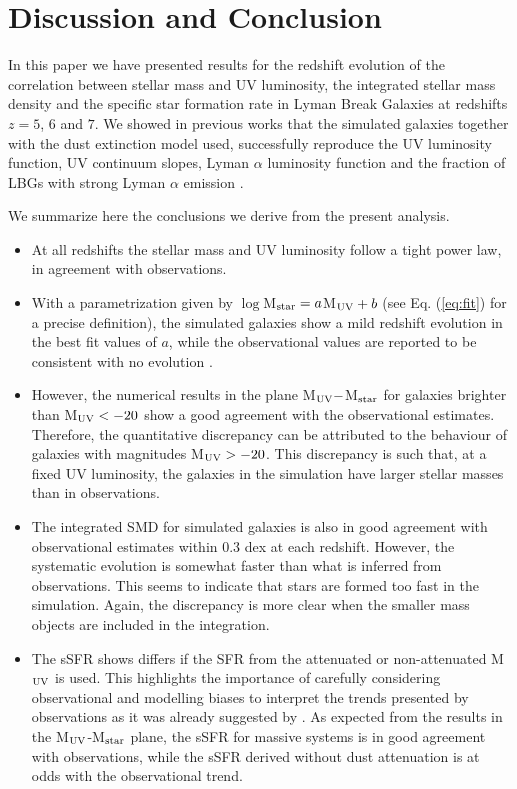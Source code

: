 \documentclass{emulateapj}
\begin{document}
\section{Discussion and Conclusion}
\label{sec:conclusions}

In this paper we have presented results for the redshift evolution of
the correlation between stellar mass and UV luminosity, the integrated stellar mass
density and the specific star formation rate in Lyman Break Galaxies
at redshifts $z=5$, $6$ and $7$. We showed in previous works that the
simulated galaxies together with the dust extinction model used,
successfully reproduce the UV luminosity function, UV continuum slopes, Lyman $\alpha$
luminosity function and the fraction of LBGs with strong Lyman $\alpha$ emission \citep{2010MNRAS.403L..31F,2011MNRAS.415.3666F,2012MNRAS.419..952F}. 


We summarize here the conclusions we derive from the present analysis.

\begin{itemize}
\item At all redshifts the stellar mass and UV luminosity follow a
  tight power law, in agreement with observations.
\item With a parametrization given by $\log $M$_{\rm star} = a
  $M$_{\rm UV} + b$ (see Eq. (\ref{eq:fit}) for a precise definition),
  the simulated galaxies show a mild redshift  evolution in the
  best fit values  of $a$, while the observational values are
  reported to be consistent with no evolution \citep{2011ApJ...735L..34G}. 
\item   However, the numerical results in the
  plane M$_{\rm UV}- $M$_{\rm star}$ for   galaxies  brighter than
  M$_{\rm UV}<-20$ show a good agreement with   the observational
  estimates. Therefore, the quantitative discrepancy can be attributed
  to the behaviour of galaxies with magnitudes M$_{\rm UV}>-20$.   This discrepancy is such that, at a fixed UV luminosity, the galaxies in the simulation have larger stellar masses than in observations.
\item The integrated SMD for simulated galaxies is also in good agreement with observational
  estimates within 0.3 dex at each redshift. However, the systematic evolution is somewhat faster
  than what is inferred from observations. This seems to indicate that stars
  are formed too fast in the simulation. Again, the discrepancy is
  more clear when the smaller mass objects are included in the integration.
\item The sSFR shows differs if the SFR from
  the attenuated or non-attenuated M$_{\rm UV}$ is used. This highlights the importance of carefully  considering observational and modelling biases to interpret the  trends presented by observations as it was already suggested by  \citet{2011MNRAS.414.1927S}.  As expected from
  the results in the M$_{\rm UV}$-M$_{\rm star}$ plane, the sSFR for
  massive systems is in good agreement with observations, while the
  sSFR derived without dust attenuation is at odds with the
  observational trend. 
\end{itemize}
\end{document}
